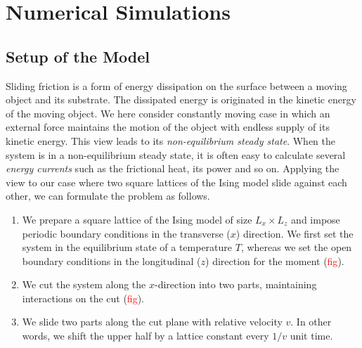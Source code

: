 \chapter{Numerical Simulations}

\section{Setup of the Model}

Sliding friction is a form of energy dissipation on the surface between a moving object and its substrate. The dissipated energy is originated in the kinetic energy of the moving object. We here consider constantly moving case in which an external force maintains the motion of the object with endless supply of its kinetic energy. This view leads to its \textit{non-equilibrium steady state}. When the system is in a non-equilibrium steady state, it is often easy to calculate several \textit{energy currents} such as the frictional heat, its power and so on. Applying the view to our case where two square lattices of the Ising model slide against each other, we can formulate the problem as follows.
\begin{enumerate}
	\item We prepare a square lattice of the Ising model of size $L_{x}\times L_{z}$ and impose periodic boundary conditions in the transverse ($x$) direction. We first set the system in the equilibrium state of a temperature $T$, whereas we set the open boundary conditions in the longitudinal ($z$) direction for the moment (\textcolor{red}{fig}).
	\item We cut the system along the $x$-direction into two parts, maintaining interactions on the cut (\textcolor{red}{fig}).
	\item We slide two parts along the cut plane with relative velocity $v$. In other words, we shift the upper half by a lattice constant every $1/v$ unit time. 
\end{enumerate}

